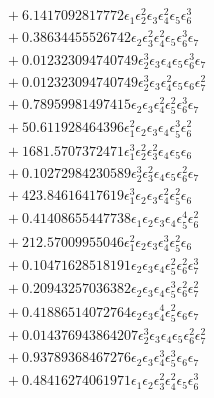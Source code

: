 \documentclass[10pt]{article}
\begin{document}
\begin{align*}
&{}  + 6.1417092817772 \epsilon_{1} \epsilon_{2}^{2} \epsilon_{3} \epsilon_{4}^{2} \epsilon_{5} \epsilon_{6}^{3} \\
&{}  + 0.38634455526742 \epsilon_{2} \epsilon_{3}^{2} \epsilon_{4}^{2} \epsilon_{5} \epsilon_{6}^{3} \epsilon_{7} \\
&{}  + 0.012323094740749 \epsilon_{2}^{3} \epsilon_{3} \epsilon_{4} \epsilon_{5} \epsilon_{6}^{3} \epsilon_{7} \\
&{}  + 0.012323094740749 \epsilon_{2}^{3} \epsilon_{3} \epsilon_{4}^{2} \epsilon_{5} \epsilon_{6} \epsilon_{7}^{2} \\
&{}  + 0.78959981497415 \epsilon_{2} \epsilon_{3} \epsilon_{4}^{2} \epsilon_{5}^{2} \epsilon_{6}^{3} \epsilon_{7} \\
&{}  + 50.611928464396 \epsilon_{1}^{2} \epsilon_{2} \epsilon_{3} \epsilon_{4} \epsilon_{5}^{3} \epsilon_{6}^{2} \\
&{}  + 1681.5707372471 \epsilon_{1}^{3} \epsilon_{2}^{2} \epsilon_{3}^{2} \epsilon_{4} \epsilon_{5} \epsilon_{6} \\
&{}  + 0.10272984230589 \epsilon_{2}^{3} \epsilon_{3}^{2} \epsilon_{4} \epsilon_{5} \epsilon_{6}^{2} \epsilon_{7} \\
&{}  + 423.84616417619 \epsilon_{1}^{3} \epsilon_{2} \epsilon_{3} \epsilon_{4}^{2} \epsilon_{5}^{2} \epsilon_{6} \\
&{}  + 0.41408655447738 \epsilon_{1} \epsilon_{2} \epsilon_{3} \epsilon_{4} \epsilon_{5}^{4} \epsilon_{6}^{2} \\
&{}  + 212.57009955046 \epsilon_{1}^{2} \epsilon_{2} \epsilon_{3} \epsilon_{4}^{3} \epsilon_{5}^{2} \epsilon_{6} \\
&{}  + 0.10471628518191 \epsilon_{2} \epsilon_{3} \epsilon_{4} \epsilon_{5}^{2} \epsilon_{6}^{2} \epsilon_{7}^{3} \\
&{}  + 0.20943257036382 \epsilon_{2} \epsilon_{3} \epsilon_{4} \epsilon_{5}^{3} \epsilon_{6}^{2} \epsilon_{7}^{2} \\
&{}  + 0.41886514072764 \epsilon_{2} \epsilon_{3} \epsilon_{4}^{4} \epsilon_{5}^{2} \epsilon_{6} \epsilon_{7} \\
&{}  + 0.014376943864207 \epsilon_{2}^{3} \epsilon_{3} \epsilon_{4} \epsilon_{5} \epsilon_{6}^{2} \epsilon_{7}^{2} \\
&{}  + 0.93789368467276 \epsilon_{2} \epsilon_{3} \epsilon_{4}^{3} \epsilon_{5}^{3} \epsilon_{6} \epsilon_{7} \\
&{}  + 0.48416274061971 \epsilon_{1} \epsilon_{2} \epsilon_{3}^{2} \epsilon_{4}^{2} \epsilon_{5} \epsilon_{6}^{3} \\

\end{align*}
\end{document}

